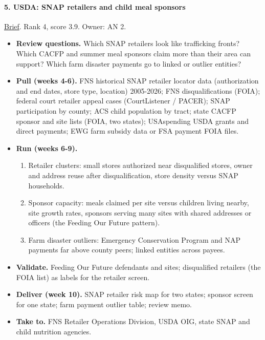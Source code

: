 \documentclass[letterpaper,11pt]{article}
\providecommand{\tightlist}{\setlength{\itemsep}{0pt}\setlength{\parskip}{0pt}}
\begin{document}
\hypertarget{usda-snap-retailers-and-child-meal-sponsors}{%
\paragraph{5. USDA: SNAP retailers and child meal
sponsors}\label{usda-snap-retailers-and-child-meal-sponsors}}

\href{agencies/usda.pdf}{Brief}. Rank 4, score 3.9. Owner: AN 2.

\begin{itemize}
\tightlist
\item
  \textbf{Review questions.} Which SNAP retailers look like trafficking
  fronts? Which CACFP and summer meal sponsors claim more than their
  area can support? Which farm disaster payments go to linked or outlier
  entities?
\item
  \textbf{Pull (weeks 4-6).} FNS historical SNAP retailer locator data
  (authorization and end dates, store type, location) 2005-2026; FNS
  disqualifications (FOIA); federal court retailer appeal cases
  (CourtListener / PACER); SNAP participation by county; ACS child
  population by tract; state CACFP sponsor and site lists (FOIA, two
  states); USAspending USDA grants and direct payments; EWG farm subsidy
  data or FSA payment FOIA files.
\item
  \textbf{Run (weeks 6-9).}

  \begin{enumerate}
  \def\labelenumi{\arabic{enumi}.}
  \tightlist
  \item
    Retailer clusters: small stores authorized near disqualified stores,
    owner and address reuse after disqualification, store density versus
    SNAP households.
  \item
    Sponsor capacity: meals claimed per site versus children living
    nearby, site growth rates, sponsors serving many sites with shared
    addresses or officers (the Feeding Our Future pattern).
  \item
    Farm disaster outliers: Emergency Conservation Program and NAP
    payments far above county peers; linked entities across payees.
  \end{enumerate}
\item
  \textbf{Validate.} Feeding Our Future defendants and sites;
  disqualified retailers (the FOIA list) as labels for the retailer
  screen.
\item
  \textbf{Deliver (week 10).} SNAP retailer risk map for two states;
  sponsor screen for one state; farm payment outlier table; review memo.
\item
  \textbf{Take to.} FNS Retailer Operations Division, USDA OIG, state
  SNAP and child nutrition agencies.
\end{itemize}
\end{document}
